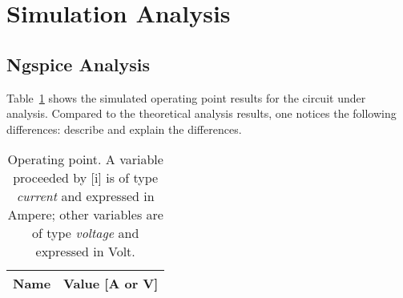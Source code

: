 \section{Simulation Analysis}
\label{sec:simulation}

\subsection{Ngspice Analysis}

Table~\ref{tab:op} shows the simulated operating point results for the circuit
under analysis. Compared to the theoretical analysis results, one notices the
following differences: describe and explain the differences.

\begin{table}[h]
  \centering
  \begin{tabular}{|l|r|}
    \hline    
    {\bf Name} & {\bf Value [A or V]} \\ \hline
    
  \end{tabular}
  \caption{Operating point. A variable proceeded by [i] is of type {\em current}
    and expressed in Ampere; other variables are of type {\it voltage} and expressed in
    Volt.}
  \label{tab:op}
\end{table}











